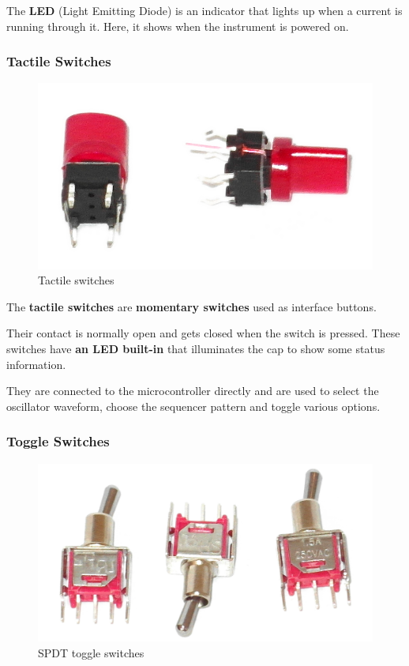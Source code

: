 \documentclass{scrartcl}
\begin{document}
The \textbf{LED} (Light Emitting Diode) is an indicator that lights up when a current is running through it.
Here, it shows when the instrument is powered on.

\subsubsection{Tactile Switches}

\begin{figure}[!ht]
    \begin{center}
        \includegraphics[scale=0.20]{assets/zekit-tacts.jpg}
        \caption{Tactile switches}
    \end{center}
\end{figure}

The \textbf{tactile switches} are \textbf{momentary switches} used as interface buttons.

Their contact is normally open and gets closed when the switch is pressed. These switches have \textbf{an LED built-in} that illuminates the cap to show some status information.

They are connected to the microcontroller directly and are used to select the oscillator waveform, choose the sequencer pattern and toggle various options.

\subsubsection{Toggle Switches}

\begin{figure}[!ht]
    \begin{center}
        \includegraphics[scale=0.16]{assets/zekit-toggles.jpg}
        \caption{SPDT toggle switches}
    \end{center}
\end{figure}
\end{document}
